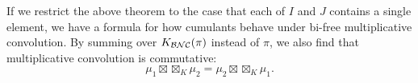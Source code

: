 If we restrict the above theorem to the case that each of $I$ and $J$ contains a single element, we have a formula for how cumulants behave under bi-free multiplicative convolution.
By summing over $K_{\mathcal{BNC}}(\pi)$ instead of $\pi$, we also find that multiplicative convolution is commutative:
$$\mu_1\boxtimes\boxtimes_K\mu_2 = \mu_2\boxtimes\boxtimes_K\mu_1.$$
% 
% 
% 
% 
% 
% 
% 
% 
% 

